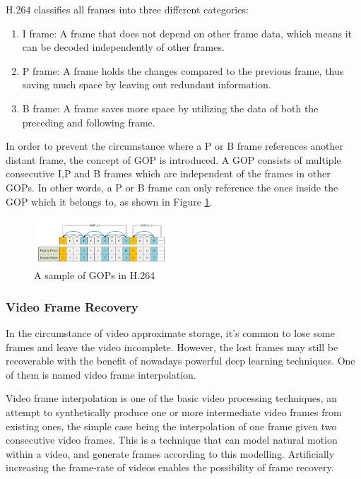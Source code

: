\documentclass[sigconf]{acmart}
\begin{document}
H.264 classifies all frames into three different categories:
\begin{enumerate}
    \item I frame: A frame that does not depend on other frame data, which means it can be decoded independently of other frames.
    \item P frame: A frame holds the changes compared to the previous frame, thus saving much space by leaving out redundant information.
    \item B frame: A frame saves more space by utilizing the data of both the preceding and following frame.
\end{enumerate}
In order to prevent the circumstance where a P or B frame references another distant frame, the concept of GOP is introduced. A GOP consists of multiple consecutive I,P and B frames which are independent of the frames in other GOPs. In other words, a P or B frame can only reference the ones inside the GOP which it belongs to, as shown in Figure \ref{H264-IPB}.
\begin{figure}[ht]
\centering
\includegraphics[width=0.45\textwidth]{photo/H264_IPB.pdf}
\caption{A sample of GOPs in H.264}
\label{H264-IPB}
\end{figure}


\subsubsection{Video Frame Recovery}

In the circumstance of video approximate storage, it's common to lose some frames and leave the video incomplete. However, the lost frames may still be recoverable with the benefit of nowadays powerful deep learning techniques. One of them is named video frame interpolation.

Video frame interpolation is one of the basic video processing techniques, an attempt to synthetically produce one or more intermediate video frames from existing ones, the simple case being the interpolation of one frame given two consecutive video frames. This is a technique that can model natural motion within a video, and generate frames according to this modelling. Artificially increasing the frame-rate of videos enables the possibility of frame recovery.
\end{document}
